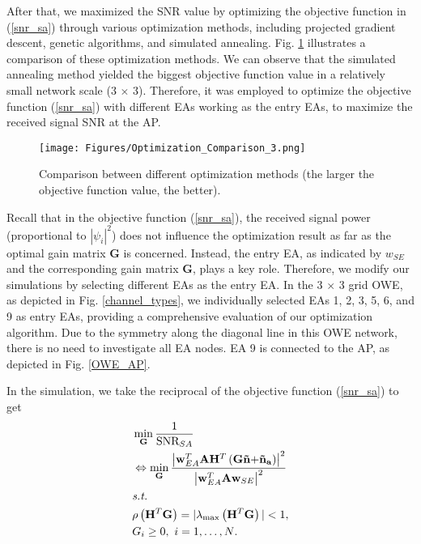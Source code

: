 \par
After that, we maximized the SNR value by optimizing the objective function in (\ref{snr_sa}) through various optimization methods, including projected gradient descent, genetic algorithms, and simulated annealing. Fig. \ref{opt_methods} illustrates a comparison of these optimization methods. We can observe that the simulated annealing method yielded the biggest objective function value in a relatively small network scale (3 $\times$ 3). Therefore, it was employed to optimize the objective function (\ref{snr_sa}) with different EAs working as the entry EAs, to maximize the received signal SNR at the AP.
\begin{figure}
\centering
\texttt{[image: Figures/Optimization\_Comparison\_3.png]}
\caption{Comparison between different optimization methods (the larger the objective function value, the better).}
\label{opt_methods}
\vspace{-0.5cm}
\end{figure}
\par
Recall that in the objective function (\ref{snr_sa}), the received signal power (proportional to $|\psi_i|^2$) does not influence the optimization result as far as the optimal gain matrix $\mathbf{G}$ is concerned. Instead, the entry EA, as indicated by $w_{SE}$ and the corresponding gain matrix $\mathbf{G}$, plays a key role. Therefore, we modify our simulations by selecting different EAs as the entry EA.
In the 3 $\times$ 3 grid OWE, as depicted in Fig. \ref{channel_types}, we individually selected EAs 1, 2, 3, 5, 6, and 9 as entry EAs, providing a comprehensive evaluation of our optimization algorithm. Due to the symmetry along the diagonal line in this OWE network, there is no need to investigate all EA nodes. EA 9 is connected to the AP, as depicted in Fig. \ref{OWE_AP}. 
\par
In the simulation, we take the reciprocal of the objective function 
(\ref{snr_sa}) to get
\begin{align}
\label{r_single_bss_obj}
&\min_\mathbf{G} {\frac{1}{\text{SNR}_{SA}}} \notag \\
&\Leftrightarrow \min_\mathbf{G} 
\frac{{{{\left| {\mathbf{w}_{EA}^T\mathbf{A}{\mathbf{H}^T}\left( {\mathbf{G\tilde n + }{{\mathbf{\tilde n}}_\mathbf{a}}} \right)} \right|}^2}}}{{{{\left|\mathbf{w}_{EA}^T\mathbf{A}{\mathbf{w}_{SE}} \right|}^2}}} \\
&\textit{s.t.} \notag \\
& \rho\left({\mathbf{H}^T}\mathbf{G}\right)=|\lambda_{\max}\left({\mathbf{H}^T}\mathbf{G}\right)|<1, \notag \\
& G_i\geq0,{\ }i=1,\dots, N \text{.} \notag
\end{align}
